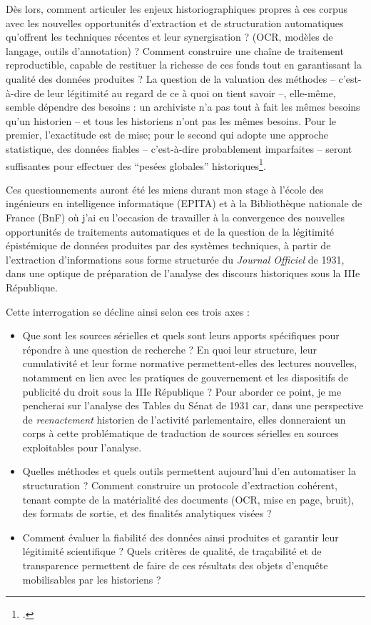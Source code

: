 Dès lors, comment articuler les enjeux historiographiques propres à ces corpus avec les nouvelles opportunités d’extraction et de structuration automatiques qu’offrent les techniques récentes et leur synergisation ? (OCR, modèles de langage, outils d’annotation) ? Comment construire une chaîne de traitement reproductible, capable de restituer la richesse de ces fonds tout en garantissant la qualité des données produites ? La question de la valuation des méthodes -- c'est-à-dire de leur légitimité au regard de ce à quoi on tient savoir --, elle-même, semble dépendre des besoins : un archiviste n'a pas tout à fait les mêmes besoins qu'un historien -- et tous les historiens n'ont pas les mêmes besoins. Pour le premier, l'exactitude est de mise; pour le second qui adopte une approche statistique, des données fiables -- c'est-à-dire probablement imparfaites -- seront suffisantes pour effectuer des \enquote{pesées globales} historiques\footcite{muller}.


Ces questionnements auront été les miens durant mon stage à l'école des ingénieurs en intelligence informatique (EPITA) et à la Bibliothèque nationale de France (BnF) où j'ai eu l'occasion de travailler à la convergence des nouvelles opportunités de traitements automatiques et de la question de la légitimité épistémique de données produites par des systèmes techniques, à partir de l'extraction d'informations sous forme structurée du \textit{Journal Officiel} de 1931, dans une optique de préparation de l'analyse des discours historiques sous la IIIe République. 

Cette interrogation se décline ainsi selon ces trois axes :

\begin{itemize}
	\item Que sont les sources sérielles et quels sont leurs apports spécifiques pour répondre à une question de recherche ? En quoi leur structure, leur cumulativité et leur forme normative permettent-elles des lectures nouvelles, notamment en lien avec les pratiques de gouvernement et les dispositifs de publicité du droit sous la IIIe République ? Pour aborder ce point, je me pencherai sur l'analyse des Tables du Sénat de 1931 car, dans une perspective de \textit{reenactement} historien de l'activité parlementaire, elles donneraient un corps à cette problématique de traduction de sources sérielles en sources exploitables pour l'analyse.
	\item Quelles méthodes et quels outils permettent aujourd’hui d’en automatiser la structuration ? Comment construire un protocole d’extraction cohérent, tenant compte de la matérialité des documents (OCR, mise en page, bruit), des formats de sortie, et des finalités analytiques visées ?
	\item Comment évaluer la fiabilité des données ainsi produites et garantir leur légitimité scientifique ? Quels critères de qualité, de traçabilité et de transparence permettent de faire de ces résultats des objets d’enquête mobilisables par les historiens ?
\end{itemize}

